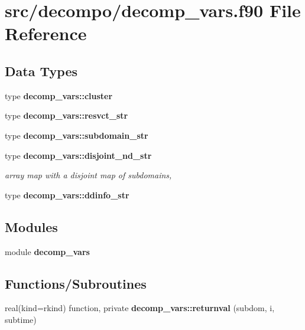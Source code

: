 \section{src/decompo/decomp\+\_\+vars.f90 File Reference}
\label{decomp__vars_8f90}
\subsection*{Data Types}
\begin{DoxyCompactItemize}
\item 
type {\bf decomp\+\_\+vars\+::cluster}
\item 
type {\bf decomp\+\_\+vars\+::resvct\+\_\+str}
\item 
type {\bf decomp\+\_\+vars\+::subdomain\+\_\+str}
\item 
type {\bf decomp\+\_\+vars\+::disjoint\+\_\+nd\+\_\+str}
\begin{DoxyCompactList}\small\item\em array map with a disjoint map of subdomains, \end{DoxyCompactList}\item 
type {\bf decomp\+\_\+vars\+::ddinfo\+\_\+str}
\end{DoxyCompactItemize}
\subsection*{Modules}
\begin{DoxyCompactItemize}
\item 
module {\bf decomp\+\_\+vars}
\end{DoxyCompactItemize}
\subsection*{Functions/\+Subroutines}
\begin{DoxyCompactItemize}
\item 
real(kind=rkind) function, private {\bf decomp\+\_\+vars\+::returnval} (subdom, i, subtime)
\end{DoxyCompactItemize}
